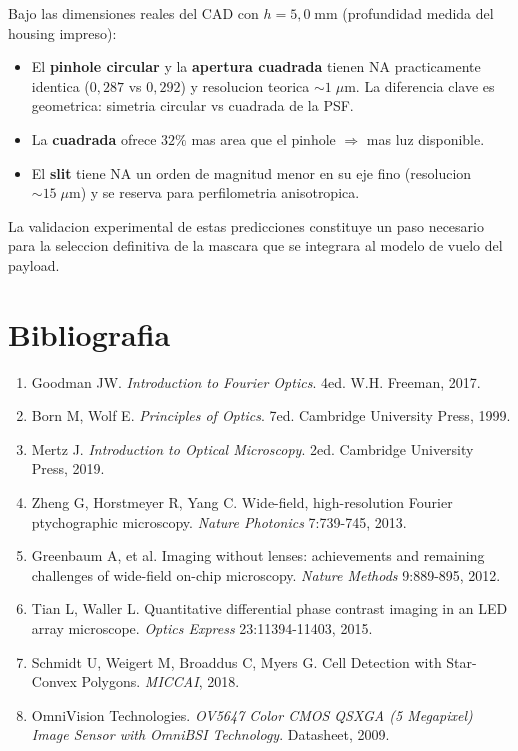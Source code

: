\documentclass[11pt,a4paper,oneside]{report}
\begin{document}
Bajo las dimensiones reales del CAD con $h = 5{,}0\;\mathrm{mm}$ (profundidad
medida del housing impreso):

\begin{itemize}[leftmargin=2em]
  \item El \textbf{pinhole circular} y la \textbf{apertura cuadrada}
        tienen NA practicamente identica ($0{,}287$ vs $0{,}292$) y
        resolucion teorica $\sim 1\;\mu\mathrm{m}$. La diferencia clave
        es geometrica: simetria circular vs cuadrada de la PSF.
  \item La \textbf{cuadrada} ofrece $32\%$ mas area que el pinhole
        $\Rightarrow$ mas luz disponible.
  \item El \textbf{slit} tiene NA un orden de magnitud menor en su eje fino
        (resolucion $\sim 15\;\mu\mathrm{m}$) y se reserva para perfilometria
        anisotropica.
\end{itemize}

La validacion experimental de estas predicciones constituye un paso
necesario para la seleccion definitiva de la mascara que se integrara al
modelo de vuelo del payload.

\chapter*{Bibliografia}

{\small
\noindent
\begin{enumerate}[leftmargin=2em]
\item Goodman JW. \emph{Introduction to Fourier Optics}. 4ed. W.H. Freeman, 2017.
\item Born M, Wolf E. \emph{Principles of Optics}. 7ed. Cambridge University Press, 1999.
\item Mertz J. \emph{Introduction to Optical Microscopy}. 2ed. Cambridge University Press, 2019.
\item Zheng G, Horstmeyer R, Yang C. Wide-field, high-resolution Fourier
ptychographic microscopy. \emph{Nature Photonics} 7:739-745, 2013.
\item Greenbaum A, et al. Imaging without lenses: achievements and remaining challenges of wide-field on-chip microscopy. \emph{Nature Methods} 9:889-895, 2012.
\item Tian L, Waller L. Quantitative differential phase contrast imaging in an LED array microscope. \emph{Optics Express} 23:11394-11403, 2015.
\item Schmidt U, Weigert M, Broaddus C, Myers G. Cell Detection with Star-Convex Polygons. \emph{MICCAI}, 2018.
\item OmniVision Technologies. \emph{OV5647 Color CMOS QSXGA (5 Megapixel) Image Sensor with OmniBSI Technology}. Datasheet, 2009.
\end{enumerate}
}
\end{document}
